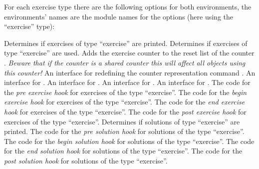 \documentclass{xsim-manual}
\begin{document}
For each exercise type there are the following options for both environments,
the environments' names are the module names for the options (here using the
\enquote{exercise} type):
\begin{options}
    Determines if exercises of type \enquote{exercise} are printed.
    Determines if exercises of type \enquote{exercise} are used.
  \Default
    Adds the exercise counter to the reset list of the counter
    .  \emph{Beware that if the counter is a shared counter
      this will affect \emph{all objects} using this counter!}
    An interface for redefining the counter representation command
    .
    An interface for %
    .
    An interface for %
    .
    An interface for %
    .
    An interface for %
    .
  \Default
    The code for the \emph{pre exercise hook} for exercises of the type
    \enquote{exercise}.
  \Default
    The code for the \emph{begin exercise hook} for exercises of the type
    \enquote{exercise}.
  \Default
    The code for the \emph{end exercise hook} for exercises of the type
    \enquote{exercise}.
  \Default
    The code for the \emph{post exercise hook} for exercises of the type
    \enquote{exercise}.
    Determines if solutions of type \enquote{exercise} are printed.
  \Default
    The code for the \emph{pre solution hook} for solutions of the type
    \enquote{exercise}.
  \Default
    The code for the \emph{begin solution hook} for solutions of the type
    \enquote{exercise}.
  \Default
    The code for the \emph{end solution hook} for solutions of the type
    \enquote{exercise}.
  \Default
    The code for the \emph{post solution hook} for solutions of the type
    \enquote{exercise}.
\end{options}
\end{document}
